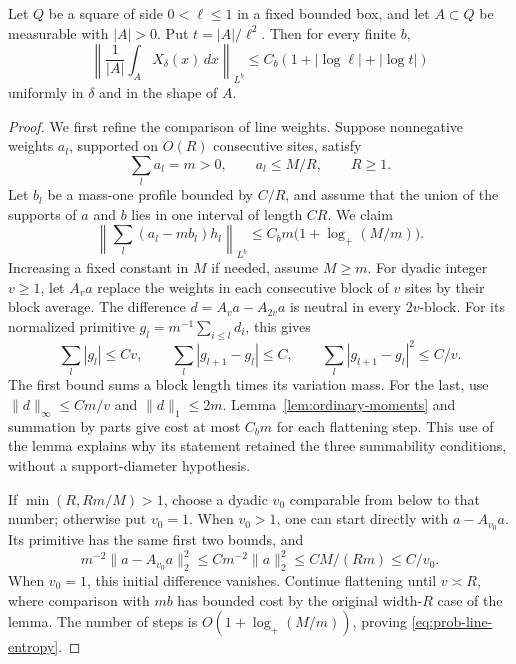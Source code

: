 \begin{lemma}\label{lem:cell-averages}
Let \(Q\) be a square of side \(0<\ell\le1\) in a fixed bounded box,
and let \(A\subset Q\) be measurable with \(|A|>0\). Put
\(t=|A|/\ell^2\). Then for every finite \(b\),
\begin{equation}\label{eq:prob-cell-average}
 \left\|\frac1{|A|}\int_A X_\delta(x)\,dx\right\|_{L^b}
 \le C_b(1+|\log\ell|+|\log t|)
\end{equation}
uniformly in \(\delta\) and in the shape of \(A\).
\end{lemma}

\begin{proof}
We first refine the comparison of line weights. Suppose nonnegative
weights \(a_l\), supported on \(O(R)\) consecutive sites, satisfy
\[
 \sum_l a_l=m>0,\qquad a_l\le M/R,\qquad R\ge1.
\]
Let \(b_l\) be a mass-one profile bounded by \(C/R\), and assume that
the union of the supports of \(a\) and \(b\) lies in one interval of
length \(CR\). We claim
\begin{equation}\label{eq:prob-line-entropy}
 \left\|\sum_l(a_l-mb_l)h_l\right\|_{L^b}
 \le C_bm\bigl(1+\log_+(M/m)\bigr).
\end{equation}
Increasing a fixed constant in \(M\) if needed, assume \(M\ge m\).
For dyadic integer \(v\ge1\), let \(A_va\) replace the weights in
each consecutive block of \(v\) sites by their block average.
The difference \(d=A_va-A_{2v}a\) is neutral in every \(2v\)-block.
For its normalized primitive \(g_l=m^{-1}\sum_{i\le l}d_i\), this gives
\[
 \sum_l|g_l|\le Cv,\qquad
 \sum_l|g_{l+1}-g_l|\le C,\qquad
 \sum_l|g_{l+1}-g_l|^2\le C/v.
\]
The first bound sums a block length times its variation mass.
For the last, use \(\|d\|_\infty\le Cm/v\) and
\(\|d\|_1\le2m\). Lemma~\ref{lem:ordinary-moments} and summation by
parts give cost at most \(C_bm\) for each flattening step. This use of
the lemma explains why its statement retained the three summability
conditions, without a support-diameter hypothesis.

If \(\min(R,Rm/M)>1\), choose a dyadic \(v_0\) comparable from below
to that number; otherwise put \(v_0=1\).
When \(v_0>1\), one can start directly with \(a-A_{v_0}a\).
Its primitive has the same first two bounds, and
\[
 m^{-2}\|a-A_{v_0}a\|_2^2
 \le C m^{-2}\|a\|_2^2
 \le CM/(Rm)\le C/v_0.
\]
When \(v_0=1\), this initial difference vanishes. Continue flattening
until \(v\asymp R\), where comparison with \(mb\) has bounded cost
by the original width-\(R\) case of the lemma. The number of steps is
\(O(1+\log_+(M/m))\), proving \eqref{eq:prob-line-entropy}.


\end{proof}
